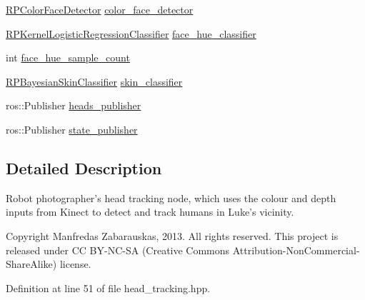 \begin{DoxyCompactItemize}
\hyperlink{class_r_p_color_face_detector}{\-R\-P\-Color\-Face\-Detector} \hyperlink{class_r_p_head_tracking_node_a4e92e10df6588934cbebd6011a68aada}{color\-\_\-face\-\_\-detector}
\item 
\hyperlink{class_r_p_kernel_logistic_regression_classifier}{\-R\-P\-Kernel\-Logistic\-Regression\-Classifier} \hyperlink{class_r_p_head_tracking_node_a9753532076085f324715162e3e1da2a6}{face\-\_\-hue\-\_\-classifier}
\item 
int \hyperlink{class_r_p_head_tracking_node_a57e407d25d6c24ebfaa9a612b63b0a07}{face\-\_\-hue\-\_\-sample\-\_\-count}
\item 
\hyperlink{class_r_p_bayesian_skin_classifier}{\-R\-P\-Bayesian\-Skin\-Classifier} \hyperlink{class_r_p_head_tracking_node_a0e3291a73d232c4725902b829cd40b2b}{skin\-\_\-classifier}
\item 
ros\-::\-Publisher \hyperlink{class_r_p_head_tracking_node_ae463557050c7ea460f519106bbecaec2}{heads\-\_\-publisher}
\item 
ros\-::\-Publisher \hyperlink{class_r_p_head_tracking_node_a2d99f169c031cc19c178c74b462c8c43}{state\-\_\-publisher}
\end{DoxyCompactItemize}


\subsection{\-Detailed \-Description}
\-Robot photographer's head tracking node, which uses the colour and depth inputs from \-Kinect to detect and track humans in \-Luke's vicinity. 

\begin{DoxyCopyright}{\-Copyright}
\-Manfredas \-Zabarauskas, 2013. \-All rights reserved. \-This project is released under \-C\-C \-B\-Y-\/\-N\-C-\/\-S\-A (\-Creative \-Commons \-Attribution-\/\-Non\-Commercial-\/\-Share\-Alike) license. 
\end{DoxyCopyright}


\-Definition at line 51 of file head\-\_\-tracking.\-hpp.



